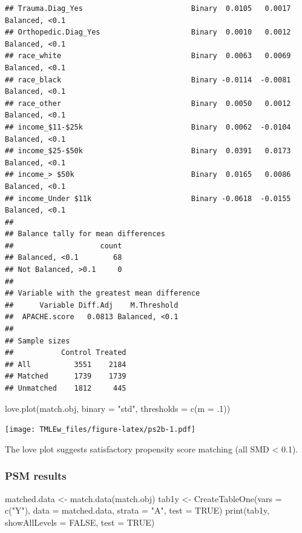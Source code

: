 \documentclass[
]{book}
\newenvironment{Shaded}{\begin{snugshade}}{\end{snugshade}}
\newcommand{\AttributeTok}[1]{\textcolor[rgb]{0.77,0.63,0.00}{#1}}
\newcommand{\ConstantTok}[1]{\textcolor[rgb]{0.00,0.00,0.00}{#1}}
\newcommand{\DecValTok}[1]{\textcolor[rgb]{0.00,0.00,0.81}{#1}}
\newcommand{\FunctionTok}[1]{\textcolor[rgb]{0.00,0.00,0.00}{#1}}
\newcommand{\NormalTok}[1]{#1}
\newcommand{\OtherTok}[1]{\textcolor[rgb]{0.56,0.35,0.01}{#1}}
\newcommand{\StringTok}[1]{\textcolor[rgb]{0.31,0.60,0.02}{#1}}
\begin{document}
\begin{verbatim}
## Trauma.Diag_Yes                         Binary  0.0105   0.0017 Balanced, <0.1
## Orthopedic.Diag_Yes                     Binary  0.0010   0.0012 Balanced, <0.1
## race_white                              Binary  0.0063   0.0069 Balanced, <0.1
## race_black                              Binary -0.0114  -0.0081 Balanced, <0.1
## race_other                              Binary  0.0050   0.0012 Balanced, <0.1
## income_$11-$25k                         Binary  0.0062  -0.0104 Balanced, <0.1
## income_$25-$50k                         Binary  0.0391   0.0173 Balanced, <0.1
## income_> $50k                           Binary  0.0165   0.0086 Balanced, <0.1
## income_Under $11k                       Binary -0.0618  -0.0155 Balanced, <0.1
## 
## Balance tally for mean differences
##                    count
## Balanced, <0.1        68
## Not Balanced, >0.1     0
## 
## Variable with the greatest mean difference
##      Variable Diff.Adj    M.Threshold
##  APACHE.score   0.0813 Balanced, <0.1
## 
## Sample sizes
##           Control Treated
## All          3551    2184
## Matched      1739    1739
## Unmatched    1812     445
\end{verbatim}

\begin{Shaded}
\begin{Highlighting}[]
\FunctionTok{love.plot}\NormalTok{(match.obj, }\AttributeTok{binary =} \StringTok{"std"}\NormalTok{, }
          \AttributeTok{thresholds =} \FunctionTok{c}\NormalTok{(}\AttributeTok{m =}\NormalTok{ .}\DecValTok{1}\NormalTok{))  }
\end{Highlighting}
\end{Shaded}

\texttt{[image: TMLEw\_files/figure-latex/ps2b-1.pdf]}

The love plot suggests satisfactory propensity score matching (all SMD \textless{} 0.1).

\hypertarget{psm-results}{%
\subsubsection{PSM results}\label{psm-results}}

\begin{Shaded}
\begin{Highlighting}[]
\NormalTok{matched.data }\OtherTok{\textless{}{-}} \FunctionTok{match.data}\NormalTok{(match.obj)   }
\NormalTok{tab1y }\OtherTok{\textless{}{-}} \FunctionTok{CreateTableOne}\NormalTok{(}\AttributeTok{vars =} \FunctionTok{c}\NormalTok{(}\StringTok{"Y"}\NormalTok{),}
               \AttributeTok{data =}\NormalTok{ matched.data, }\AttributeTok{strata =} \StringTok{"A"}\NormalTok{, }
               \AttributeTok{test =} \ConstantTok{TRUE}\NormalTok{)}
\FunctionTok{print}\NormalTok{(tab1y, }\AttributeTok{showAllLevels =} \ConstantTok{FALSE}\NormalTok{, }
      \AttributeTok{test =} \ConstantTok{TRUE}\NormalTok{)}
\end{Highlighting}
\end{Shaded}
\end{document}
